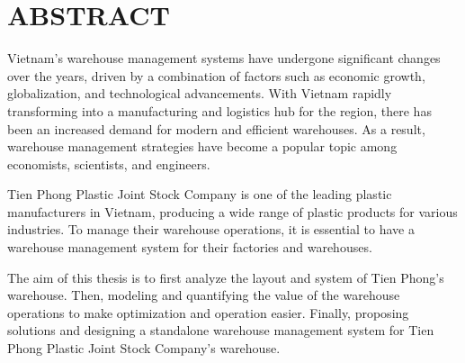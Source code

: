 \section*{ABSTRACT}
    \thispagestyle{empty}
Vietnam's warehouse management systems have undergone significant changes over the years, driven by a combination of factors such as economic growth, \linebreak globalization, and technological advancements. With Vietnam rapidly transforming into a manufacturing and logistics hub for the region, there has been an increased demand for modern and efficient warehouses. As a result, warehouse management strategies have become a popular topic among economists, scientists, and engineers.

Tien Phong Plastic Joint Stock Company is one of the leading plastic \linebreak manufacturers in Vietnam, producing a wide range of plastic products for various industries. To manage their warehouse operations, it is essential to have a warehouse management system for their factories and warehouses.

The aim of this thesis is to first analyze the layout and system of Tien Phong's warehouse. Then, modeling and quantifying the value of the warehouse operations to make optimization and operation easier. Finally, proposing solutions and designing a standalone warehouse management system for Tien Phong Plastic Joint Stock \linebreak Company's warehouse.